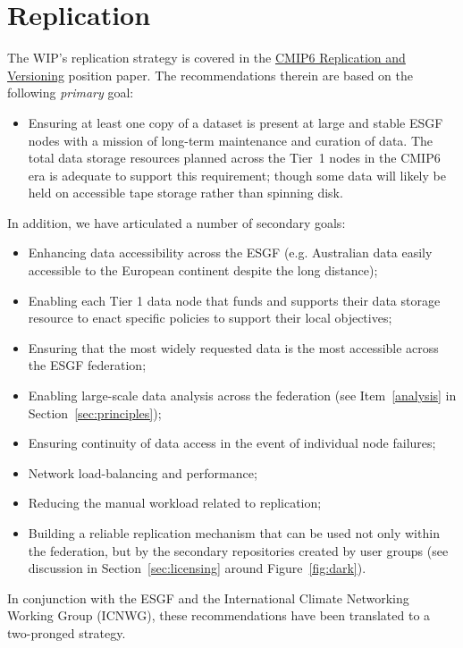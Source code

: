\documentclass[gmd,manuscript]{copernicus}
\newcommand{\figref}[1] {\mbox{Figure   \ref{fig:#1}}}
\newcommand{\secref}[1] {\mbox{Section  \ref{sec:#1}}}
\begin{document}
\section{Replication}
\label{sec:replica}

The WIP's replication strategy is covered in the
\href{https://goo.gl/jqWjQ5}{CMIP6 Replication and Versioning}
position paper. The recommendations therein are based on the following
\emph{primary} goal:

\begin{itemize}
\item Ensuring at least one copy of a dataset is present at large and
  stable ESGF nodes with a mission of long-term maintenance and
  curation of data. The total data storage resources planned across
  the Tier~1 nodes in the CMIP6 era is adequate to support this
  requirement; though some data will likely be held on accessible tape
  storage rather than spinning disk.
\end{itemize}

In addition, we have articulated a number of secondary goals:

\begin{itemize}
\item Enhancing data accessibility across the ESGF (e.g. Australian
  data easily accessible to the European continent despite the long
  distance);
\item Enabling each Tier 1 data node that funds and supports their
  data storage resource to enact specific policies to support their
  local objectives;
\item Ensuring that the most widely requested data is the most
  accessible across the ESGF federation;
\item Enabling large-scale data analysis across the federation (see
  Item~\ref{analysis} in \secref{principles});
\item Ensuring continuity of data access in the event of individual node
  failures;
\item Network load-balancing and performance;
\item Reducing the manual workload related to replication;
\item Building a reliable replication mechanism that can be used not
  only within the federation, but by the secondary repositories
  created by user groups (see discussion in \secref{licensing} around
  \figref{dark}).
\end{itemize}

In conjunction with the ESGF and the International Climate Networking
Working Group (ICNWG), these recommendations have been translated to a
two-pronged strategy.
\end{document}
